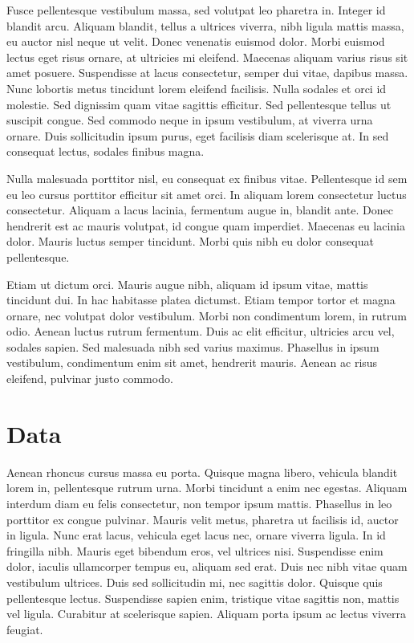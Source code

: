 \documentclass[linenumbers,RNAAS,trackchanges]{aastex631}
\begin{document}
Fusce pellentesque vestibulum massa, sed volutpat leo pharetra in. Integer id blandit arcu. Aliquam blandit, tellus a ultrices viverra, nibh ligula mattis massa, eu auctor nisl neque ut velit. Donec venenatis euismod dolor. Morbi euismod lectus eget risus ornare, at ultricies mi eleifend. Maecenas aliquam varius risus sit amet posuere. Suspendisse at lacus consectetur, semper dui vitae, dapibus massa. Nunc lobortis metus tincidunt lorem eleifend facilisis. Nulla sodales et orci id molestie. Sed dignissim quam vitae sagittis efficitur. Sed pellentesque tellus ut suscipit congue. Sed commodo neque in ipsum vestibulum, at viverra urna ornare. Duis sollicitudin ipsum purus, eget facilisis diam scelerisque at. In sed consequat lectus, sodales finibus magna.

Nulla malesuada porttitor nisl, eu consequat ex finibus vitae. Pellentesque id sem eu leo cursus porttitor efficitur sit amet orci. In aliquam lorem consectetur luctus consectetur. Aliquam a lacus lacinia, fermentum augue in, blandit ante. Donec hendrerit est ac mauris volutpat, id congue quam imperdiet. Maecenas eu lacinia dolor. Mauris luctus semper tincidunt. Morbi quis nibh eu dolor consequat pellentesque.

Etiam ut dictum orci. Mauris augue nibh, aliquam id ipsum vitae, mattis tincidunt dui. In hac habitasse platea dictumst. Etiam tempor tortor et magna ornare, nec volutpat dolor vestibulum. Morbi non condimentum lorem, in rutrum odio. Aenean luctus rutrum fermentum. Duis ac elit efficitur, ultricies arcu vel, sodales sapien. Sed malesuada nibh sed varius maximus. Phasellus in ipsum vestibulum, condimentum enim sit amet, hendrerit mauris. Aenean ac risus eleifend, pulvinar justo commodo.

\section{Data} \label{sec:data}
Aenean rhoncus cursus massa eu porta. Quisque magna libero, vehicula blandit lorem in, pellentesque rutrum urna. Morbi tincidunt a enim nec egestas. Aliquam interdum diam eu felis consectetur, non tempor ipsum mattis. Phasellus in leo porttitor ex congue pulvinar. Mauris velit metus, pharetra ut facilisis id, auctor in ligula. Nunc erat lacus, vehicula eget lacus nec, ornare viverra ligula. In id fringilla nibh. Mauris eget bibendum eros, vel ultrices nisi. Suspendisse enim dolor, iaculis ullamcorper tempus eu, aliquam sed erat. Duis nec nibh vitae quam vestibulum ultrices. Duis sed sollicitudin mi, nec sagittis dolor. Quisque quis pellentesque lectus. Suspendisse sapien enim, tristique vitae sagittis non, mattis vel ligula. Curabitur at scelerisque sapien. Aliquam porta ipsum ac lectus viverra feugiat.
\end{document}
